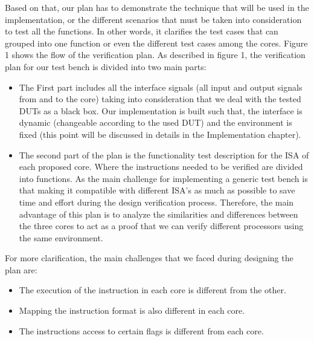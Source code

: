\documentclass[conference,10 pt,twoside]{IEEEtran}
\begin{document}
\par
Based on that, our plan has to demonstrate the technique that will be used in the implementation, or the different scenarios that must be taken into consideration to test all the functions. In other words, it clarifies the  test cases that can grouped into one function or even the different test cases among the cores. Figure 1 shows the flow of the verification plan.
\newline
As described in figure 1, the verification plan for our test bench is divided into two main parts:
\begin{itemize}
\item The First part includes all the interface signals (all input and output signals from and to the core) taking into consideration that we deal with the tested DUTs as a black box. Our implementation is built such that, the interface is dynamic (changeable according to the used DUT) and the environment is fixed (this point will be discussed in details in the Implementation chapter).
\item The second part of the plan is the functionality test description for the ISA of each proposed core. Where the instructions needed to be verified are divided into functions. As the main challenge for implementing a generic test bench is that making it compatible with different ISA's as much as possible to save time and effort during the design verification process. Therefore, the main advantage of this plan is to analyze the similarities and differences between the three cores to act as a proof that we can verify different processors using the same environment.
\newline
\end{itemize} 
\par
For more clarification, the main challenges that we faced during designing the plan are: 
\begin{itemize}
\item The execution of the instruction in each core is different from the other. 
\item Mapping the instruction format is also different in each core.
 \item The instructions access to certain flags is different from each core.
\end{itemize}
\end{document}
